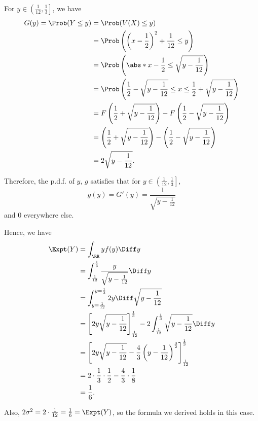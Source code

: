 For \(y \in \left(\frac{1}{12}, \frac{1}{3}\right]\), we have
\begin{align*}
    G(y) = \Prob(Y \leq y) & = \Prob(V(X) \leq y)                                                                                        \\
                           & = \Prob\left(\left(x - \frac{1}{2}\right)^2 + \frac{1}{12} \leq y\right)                                    \\
                           & = \Prob\left(\abs*{x - \frac{1}{2}} \leq \sqrt{y - \frac{1}{12}}\right)                                     \\
                           & = \Prob\left(\frac{1}{2} - \sqrt{y - \frac{1}{12}} \leq x \leq \frac{1}{2} + \sqrt{y - \frac{1}{12}}\right) \\
                           & = F\left(\frac{1}{2} + \sqrt{y - \frac{1}{12}}\right) - F\left(\frac{1}{2} - \sqrt{y - \frac{1}{12}}\right) \\
                           & = \left(\frac{1}{2} + \sqrt{y - \frac{1}{12}}\right) - \left(\frac{1}{2} - \sqrt{y - \frac{1}{12}}\right)   \\
                           & = 2 \sqrt{y - \frac{1}{12}}.
\end{align*}

Therefore, the p.d.f. of \(y\), \(g\) satisfies that for \(y \in \left(\frac{1}{12}, \frac{1}{3}\right]\),
\[
    g(y) = G'(y) = \frac{1}{\sqrt{y - \frac{1}{12}}}
\]
and \(0\) everywhere else.

Hence, we have
\begin{align*}
    \Expt(Y) & = \int_{\RR} y f(y) \Diff y                                                                                                                \\
             & = \int_{\frac{1}{12}}^{\frac{1}{3}} \frac{y}{\sqrt{y - \frac{1}{12}}} \Diff y                                                              \\
             & = \int_{y = \frac{1}{12}}^{y = \frac{1}{3}} 2y \Diff \sqrt{y - \frac{1}{12}}                                                               \\
             & = \left[2y\sqrt{y - \frac{1}{12}}\right]_{\frac{1}{12}}^{\frac{1}{3}} - 2\int_{\frac{1}{12}}^{\frac{1}{3}} \sqrt{y - \frac{1}{12}} \Diff y \\
             & = \left[2y\sqrt{y - \frac{1}{12}} - \frac{4}{3} \left(y - \frac{1}{12}\right)^{\frac{3}{2}}\right]_{\frac{1}{12}}^{\frac{1}{3}}            \\
             & = 2 \cdot \frac{1}{3} \cdot \frac{1}{2} - \frac{4}{3} \cdot \frac{1}{8}                                                                    \\
             & = \frac{1}{6}.
\end{align*}

Also, \(2 \sigma^2 = 2 \cdot \frac{1}{12} = \frac{1}{6} = \Expt(Y)\), so the formula we derived holds in this case.